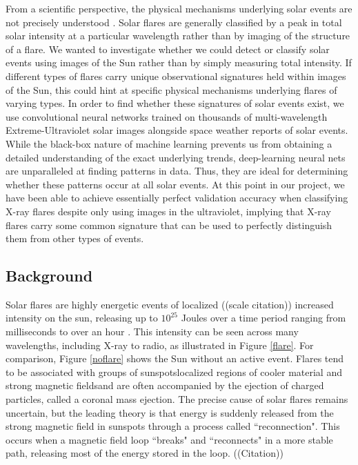 \documentclass[12pt, letterpaper]{article}
\begin{document}
From a scientific perspective, the physical mechanisms underlying solar events are not precisely understood \cite{BOB}. Solar flares are generally classified by a peak in total solar intensity at a particular wavelength rather than by imaging of the structure of a flare. We wanted to investigate whether we could detect or classify solar events using images of the Sun rather than by simply measuring total intensity. If different types of flares carry unique observational signatures held within images of the Sun, this could hint at specific physical mechanisms underlying flares of varying types. In order to find whether these signatures of solar events exist, we use convolutional neural networks trained on thousands of multi-wavelength Extreme-Ultraviolet solar images alongside space weather reports of solar events. While the black-box nature of machine learning prevents us from obtaining a detailed understanding of the exact underlying trends, deep-learning neural nets are unparalleled at finding patterns in data. Thus, they are ideal for determining whether these patterns occur at all solar events. At this point in our project, we have been able to achieve essentially perfect validation accuracy when classifying X-ray flares despite only using images in the ultraviolet, implying that X-ray flares carry some common signature that can be used to perfectly distinguish them from other types of events. 

\subsection*{Background}

Solar flares are highly energetic events of localized ((scale citation)) increased intensity on the sun, releasing up to $10^{25}$ Joules over a time period ranging from milliseconds to over an hour \cite{BOB}. This intensity can be seen across many wavelengths, including X-ray to radio, as illustrated in Figure \ref{flare}. For comparison, Figure \ref{noflare} shows the Sun without an active event. Flares tend to be associated with groups of sunspots\textemdash localized regions of cooler material and strong magnetic fields\textemdash and are often accompanied by the ejection of charged particles, called a coronal mass ejection. The precise cause of solar flares remains uncertain, but the leading theory is that energy is suddenly released from the strong magnetic field in sunspots through a process called ``reconnection". This occurs when a magnetic field loop ``breaks" and ``reconnects" in a more stable path, releasing most of the energy stored in the loop. ((Citation))
\end{document}
